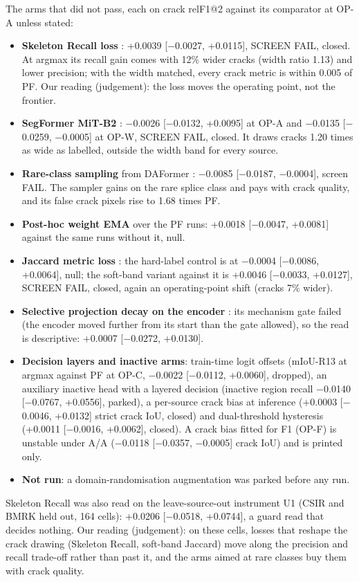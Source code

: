 The arms that did not pass, each on crack relF1@2 against its comparator at OP-A unless stated:
\begin{itemize}
  \item \textbf{Skeleton Recall loss} \citep{kirchhoff2024skeletonrecall}: +0.0039 [$-$0.0027, +0.0115], SCREEN FAIL, closed. At
  argmax its recall gain comes with 12\% wider cracks (width ratio 1.13) and lower precision; with the width matched, every crack
  metric is within 0.005 of PF. Our reading (judgement): the loss moves the operating point, not the frontier.
  \item \textbf{SegFormer MiT-B2} \citep{xie2021segformer}: $-$0.0026 [$-$0.0132, +0.0095] at OP-A and $-$0.0135 [$-$0.0259,
  $-$0.0005] at OP-W, SCREEN FAIL, closed. It draws cracks 1.20 times as wide as labelled, outside the width band for every
  source.
  \item \textbf{Rare-class sampling} from DAFormer \citep{hoyer2022daformer}: $-$0.0085 [$-$0.0187, $-$0.0004], screen FAIL. The
  sampler gains on the rare splice class and pays with crack quality, and its false crack pixels rise to 1.68 times PF.
  \item \textbf{Post-hoc weight EMA} \citep{moralesbrotons2024ema} over the PF runs: +0.0018 [$-$0.0047, +0.0081] against the
  same runs without it, null.
  \item \textbf{Jaccard metric loss} \citep{wang2023jml}: the hard-label control is at $-$0.0004 [$-$0.0086, +0.0064], null; the
  soft-band variant against it is +0.0046 [$-$0.0033, +0.0127], SCREEN FAIL, closed, again an operating-point shift (cracks 7\%
  wider).
  \item \textbf{Selective projection decay on the encoder} \citep{tian2024spd}: its mechanism gate failed (the encoder moved
  further from its start than the gate allowed), so the read is descriptive: +0.0007 [$-$0.0272, +0.0130].
  \item \textbf{Decision layers and inactive arms}: train-time logit offsets (mIoU-R13 at argmax against PF at OP-C, $-$0.0022 [$-$0.0112, +0.0060],
  dropped), an auxiliary inactive head with a layered decision (inactive region recall $-$0.0140 [$-$0.0767, +0.0556], parked),
  a per-source crack bias at inference ($+$0.0003 [$-$0.0046, +0.0132] strict crack IoU, closed) and dual-threshold hysteresis
  (+0.0011 [$-$0.0016, +0.0062], closed). A crack bias fitted for F1 (OP-F) is unstable under A/A ($-$0.0118 [$-$0.0357,
  $-$0.0005] crack IoU) and is printed only.
  \item \textbf{Not run}: a domain-randomisation augmentation \citep{ouyang2021gin} was parked before any run.
\end{itemize}
Skeleton Recall was also read on the leave-source-out instrument U1 (CSIR and BMRK held out, 164 cells): +0.0206
[$-$0.0518, +0.0744], a guard read that decides nothing. Our reading (judgement): on these cells, losses that reshape the crack
drawing (Skeleton Recall, soft-band Jaccard) move along the precision and recall trade-off rather than past it, and the arms
aimed at rare classes buy them with crack quality.

